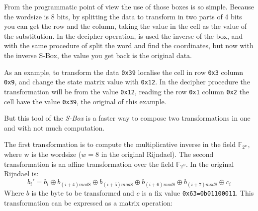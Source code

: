 \documentclass[a4paper,twoside]{llncs}
\newcommand{\Fpn}[2]{\ensuremath{\mathbb{F}_{#1^#2}}}
\begin{document}
From the programmatic point of view the use of those boxes is so simple. Because the wordsize is 8 bits, by splitting the data to transform in two parts of 4 bits you can get the row and the column, taking the value in the cell as the value of the substitution. In the decipher operation, is used the inverse of the box, and with the same procedure of split the word and find the coordinates, but now with the inverse S-Box, the value you get back is the original data.

As an example, to transform the data \texttt{0x39} localise the cell in row \texttt{0x3} column \texttt{0x9}, and change the state matrix value with \texttt{0x12}. In the decipher procedure the transformation will be from the value \texttt{0x12}, reading the row \texttt{0x1} column \texttt{0x2} the cell have the value \texttt{0x39}, the original of this example.


But this tool of the \emph{S-Box} is a faster way to compose two transformations in one and with not much computation.

The first transformation is to compute the multiplicative inverse in the field \Fpn{2}{w}, where w is the wordsize ($w=8$ in the original Rijndael). The second transformation is an affine transformation over the field \Fpn{2}{w}. In the original Rijndael is:
\begin{equation}\label{eq:subBytes:affine}
 b_{i}' = b_{i} \oplus b_{(i+4)mod8} \oplus b_{(i+5)mod8} \oplus 
          b_{(i+6)mod8} \oplus b_{(i+7)mod8} \oplus c_{i}
\end{equation}
Where $b$ is the byte to be transformed and $c$ is a fix value \texttt{0x63=0b01100011}. This transformation can be expressed as a matrix operation:
\end{document}
